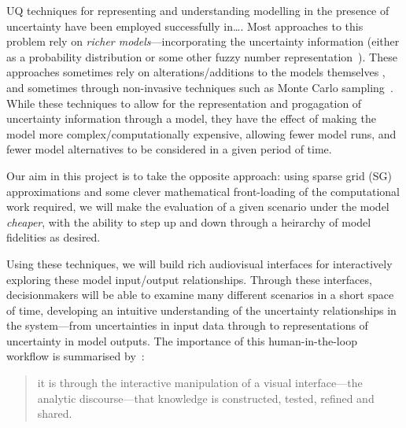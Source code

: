 \documentclass[a4paper,fontsize=12pt]{scrartcl}
\begin{document}
UQ techniques for representing and understanding modelling in the
presence of uncertainty have been
employed successfully in\ldots{}. Most approaches
to this problem rely on \emph{richer models}---incorporating the
uncertainty information (either as a probability distribution or some
other fuzzy number representation~\parencite{_hybrid_2003}). These
approaches sometimes rely on alterations/additions to the models themselves
\parencite[e.g. adjoint models][]{errico_what_1997}, and sometimes
through non-invasive techniques such as Monte Carlo
sampling~\parencite{roy_comprehensive_2011}. While these techniques to
allow for the representation and progagation of uncertainty
information through a model, they have the effect of making the model
more complex/computationally expensive,
allowing fewer model runs, and fewer model alternatives to be
considered in a given period of time.

Our aim in this project is to take the opposite  approach: using sparse grid (SG) approximations and some clever
mathematical front-loading of the computational work required, we will
make the evaluation of a given scenario under the model
\emph{cheaper}, with the ability to step up and down through a
heirarchy of model fidelities as desired.

Using these techniques, we will build rich audiovisual interfaces for
interactively exploring these model input/output relationships.
Through these interfaces, decisionmakers will be able to examine many
different scenarios in a short space of time, developing an intuitive
understanding of the uncertainty relationships in the system---from
uncertainties in input data through to representations of uncertainty
in model outputs. The importance of this human-in-the-loop workflow is
summarised by~\textcite{pike_science_2009}: \blockquote{it is through
  the interactive manipulation of a visual interface---the analytic
  discourse---that knowledge is constructed, tested, refined and
  shared.}


\end{document}
